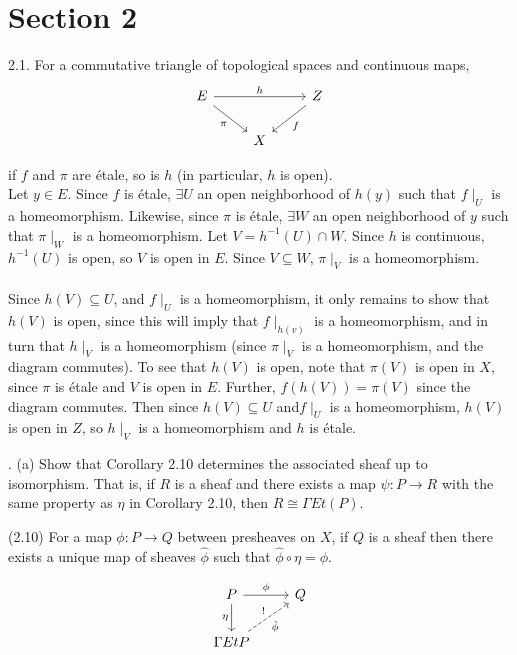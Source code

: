 \section*{Section 2}
2.1. For a commutative triangle of topological spaces and continuous maps, \\
\[
\begin{tikzcd}
	E \arrow[rr,"h"] \arrow[rd, "\pi"'] & & Z \arrow[ld, "f"]\\
	& X 
\end{tikzcd}
\]

\noindent if $f$ and $\pi$ are \'etale, so is $h$ (in particular, $h$ is open).\\

\noindent Let $y \in E$. Since $f$ is \'etale, $\exists U$ an open neighborhood of $h(y)$ such that $f \mid_U$ is a homeomorphism. Likewise, since $\pi$ is \'etale, $\exists W$ an open neighborhood of $y$ such that $\pi \mid_W$ is a homeomorphism. Let $V = h^{-1}(U) \cap W$. Since $h$ is continuous, $h^{-1}(U)$ is open, so $V$ is open in $E$. Since $V \subseteq W$, $\pi \mid_V$ is a homeomorphism.
\\\\
\noindent Since $h(V) \subseteq U$, and $f \mid_U$ is a homeomorphism, it only remains to show that $h(V)$ is open, since this will imply that $f \mid_{h(v)}$ is a homeomorphism, and in turn that $h \mid_V$ is a homeomorphism (since $\pi \mid_V$ is a homeomorphism, and the diagram commutes). To see that $h(V)$ is open, note that $\pi(V)$ is open in $X$, since $\pi$ is \'etale and $V$ is open in $E$. Further, $f(h(V)) = \pi(V)$ since the diagram commutes. Then since $h(V) \subseteq U$ and$f \mid_U$ is a homeomorphism, $h(V)$ is open in $Z$, so $h \mid_V$ is a homeomorphism and $h$ is \'etale.



\newpage
{}. (a) Show that Corollary 2.10 determines the associated sheaf up to isomorphism. That is, if $R$ is a sheaf and there exists a map $\psi: P \rightarrow R$ with the same property as $\eta$ in Corollary 2.10, then $R \cong \Gamma Et(P)$.\\ 

\begin{corollary*}
	(2.10) For a map $\phi: P \rightarrow Q$ between presheaves on $X$, if $Q$ is a sheaf then there exists a unique map of sheaves $\hat{\phi}$ such that $\hat{\phi} \circ \eta = \phi$. 
\end{corollary*}

\[
\begin{tikzcd}
P \arrow[r,"\phi"] \arrow[d, "\eta"']
& Q \\
\Gamma EtP \arrow[ru, "!", "\hat{\phi}"', dashed]
\end{tikzcd}
\]

